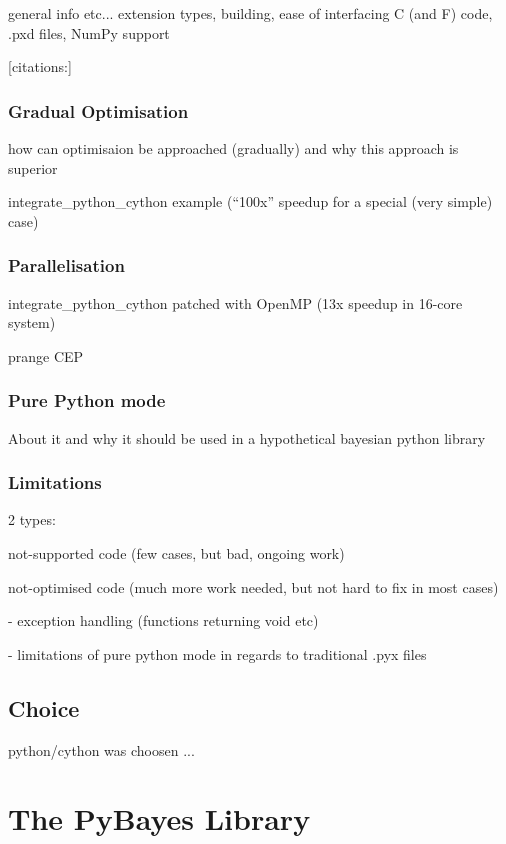 \documentclass[a4paper,12pt,oneside]{report}
\begin{document}
general info etc... extension types, building, ease of interfacing C (and F) code, .pxd files,
NumPy support

[citations:\cite{BehBraSel:09,Sel:09,BehBraCitDalSelSmi:11}]

\subsection{Gradual Optimisation}

how can optimisaion be approached (gradually) and why this approach is superior

integrate\_python\_cython example (``100x'' speedup for a special (very simple) case)

\subsection{Parallelisation}

integrate\_python\_cython patched with OpenMP (13x speedup in 16-core system)

prange CEP

\subsection{Pure Python mode}

About it and why it should be used in a hypothetical bayesian python library

\subsection{Limitations}

2 types:

	not-supported code (few cases, but bad, ongoing work)

	not-optimised code (much more work needed, but not hard to fix in most cases)

		- exception handling (functions returning void etc)

		- limitations of pure python mode in regards to traditional .pyx files

\section{Choice}

python/cython was choosen ...


\chapter{The PyBayes Library}
\end{document}
